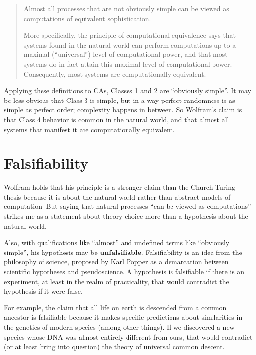 \documentclass[12pt]{book}
\theoremstyle{exercise}
\begin{document}
\begin{quote}
Almost all processes that are not obviously simple can be viewed as
computations of equivalent sophistication.

More specifically, the principle of computational equivalence says
that systems found in the natural world can perform computations up to
a maximal (``universal'') level of computational power, and that most
systems do in fact attain this maximal level of computational
power. Consequently, most systems are computationally
equivalent.
\end{quote}

Applying these definitions to CAs, Classes 1 and 2 are ``obviously
simple''.  It may be less obvious that Class 3 is simple, but in a way
perfect randomness is as simple as perfect order; complexity happens
in between.  So Wolfram's claim is that Class 4 behavior is common in
the natural world, and that almost all systems that manifest it
are computationally equivalent.



\section{Falsifiability}

Wolfram holds that his principle is a stronger claim than the
Church-Turing thesis because it is about the natural world rather
than abstract models of computation.  But saying that natural processes
``can be viewed as computations'' strikes me as a statement about
theory choice more than a hypothesis about the natural world.


Also, with qualifications like
``almost'' and undefined terms like ``obviously simple'', his
hypothesis may be {\bf unfalsifiable}.  Falsifiability is
an idea from the philosophy of science, proposed by Karl Popper
as a demarcation between scientific hypotheses and pseudoscience.
A hypothesis is falsifiable if there is an experiment, at least
in the realm of practicality, that would contradict the hypothesis
if it were false.


For example, the claim that all life on earth is descended
from a common ancestor is falsifiable because it makes specific
predictions about similarities in the genetics of modern species
(among other things).  If we discovered a new species whose
DNA was almost entirely different from ours, that would
contradict (or at least bring into question) the theory of
universal common descent.
\end{document}
